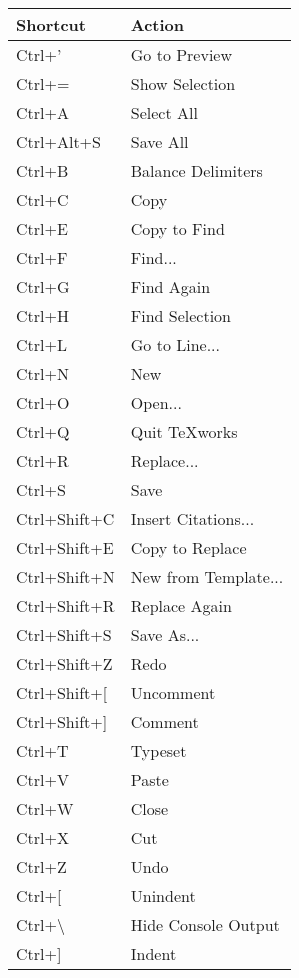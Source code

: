 \begin{longtable}{Pl}
\toprule
Shortcut            & Action \\
\midrule \endhead
Ctrl+'              & Go to Preview \\
Ctrl+=              & Show Selection \\
Ctrl+A              & Select All \\
Ctrl+Alt+S          & Save All \\
Ctrl+B              & Balance Delimiters \\
Ctrl+C              & Copy \\
Ctrl+E              & Copy to Find \\
Ctrl+F              & Find... \\
Ctrl+G              & Find Again \\
Ctrl+H              & Find Selection \\
Ctrl+L              & Go to Line... \\
Ctrl+N              & New \\
Ctrl+O              & Open... \\
Ctrl+Q              & Quit TeXworks \\
Ctrl+R              & Replace... \\
Ctrl+S              & Save \\
Ctrl+Shift+C        & Insert Citations... \\
Ctrl+Shift+E        & Copy to Replace \\
Ctrl+Shift+N        & New from Template... \\
Ctrl+Shift+R        & Replace Again \\
Ctrl+Shift+S        & Save As... \\
Ctrl+Shift+Z        & Redo \\
Ctrl+Shift+[        & Uncomment \\
Ctrl+Shift+]        & Comment \\
Ctrl+T              & Typeset \\
Ctrl+V              & Paste \\
Ctrl+W              & Close \\
Ctrl+X              & Cut \\
Ctrl+Z              & Undo \\
Ctrl+[              & Unindent \\
Ctrl+\textbackslash & Hide Console Output \\
Ctrl+]              & Indent \\
\bottomrule
\end{longtable}
